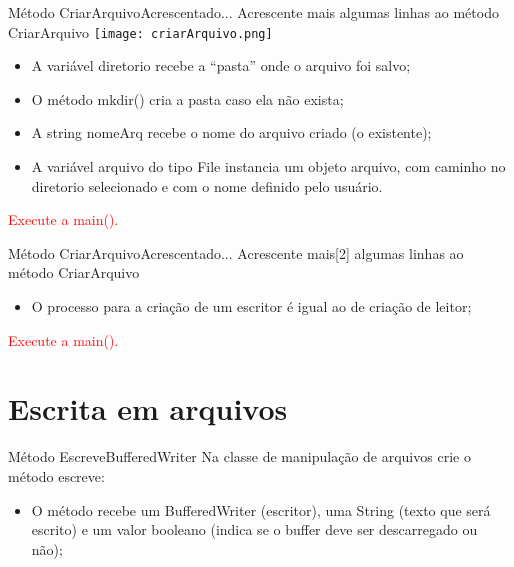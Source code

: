 \documentclass[11pt,aspectratio=43,ignorenonframetext,t]{beamer}
\begin{document}
\begin{frame}{Método CriarArquivo}{Acrescentado...}
Acrescente mais algumas linhas ao método CriarArquivo
%     
\texttt{[image: criarArquivo.png]} \\
  \pause
  \begin{itemize}
   \item A variável diretorio recebe a ``pasta'' onde o arquivo foi salvo;
   \pause \item O método mkdir() cria a pasta caso ela não exista;
   \pause \item A string nomeArq recebe o nome do arquivo criado (o existente);
   \pause \item A variável arquivo do tipo File instancia um objeto arquivo, 
com  caminho no diretorio selecionado e com o nome definido pelo usuário.
  \end{itemize}
  \pause \textcolor{red}{Execute a main().}
\end{frame}
\begin{frame}{Método CriarArquivo}{Acrescentado...}
Acrescente mais[2] algumas linhas ao método CriarArquivo
    
  \pause
  \begin{itemize}
   \item O processo para a criação de um escritor é igual ao de criação de 
leitor;
  \end{itemize}
  \pause \textcolor{red}{Execute a main().}
\end{frame}

\section{Escrita em arquivos}
\begin{frame}{Método Escreve}{BufferedWriter}
Na classe de manipulação de arquivos crie o método escreve:
    
  \pause
  \begin{itemize}
   \item O método recebe um BufferedWriter (escritor), uma String (texto que 
será escrito) e um valor booleano (indica se o buffer deve ser descarregado ou 
não);
  \end{itemize}

\end{frame}
\end{document}
